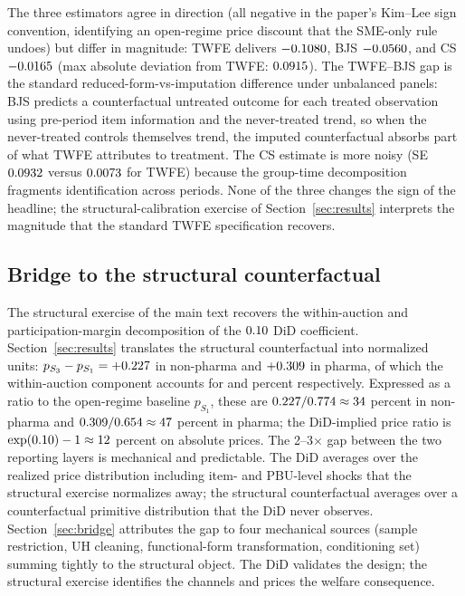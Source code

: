 The three estimators agree in direction (all negative in the paper's Kim--Lee sign convention, identifying an open-regime price discount that the SME-only rule undoes) but differ in magnitude: TWFE delivers $-0.1080$, BJS $-0.0560$, and CS $-0.0165$ (max absolute deviation from TWFE: $0.0915$). The TWFE--BJS gap is the standard reduced-form-vs-imputation difference under unbalanced panels: BJS predicts a counterfactual untreated outcome for each treated observation using pre-period item information and the never-treated trend, so when the never-treated controls themselves trend, the imputed counterfactual absorbs part of what TWFE attributes to treatment. The CS estimate is more noisy (SE $0.0932$ versus $0.0073$ for TWFE) because the group-time decomposition fragments identification across periods. None of the three changes the sign of the headline; the structural-calibration exercise of Section~\ref{sec:results} interprets the magnitude that the standard TWFE specification recovers.

\subsection{Bridge to the structural counterfactual}

The structural exercise of the main text recovers the within-auction and participation-margin decomposition of the $0.10$ DiD coefficient. Section~\ref{sec:results} translates the structural counterfactual into normalized units: $p_{S_3} - p_{S_1} = +0.227$ in non-pharma and $+0.309$ in pharma, of which the within-auction component accounts for \bneShareIntensNp{} and \bneShareIntensPh{} percent respectively. Expressed as a ratio to the open-regime baseline $p_{S_1}$, these are $0.227/0.774 \approx 34$ percent in non-pharma and $0.309/0.654 \approx 47$ percent in pharma; the DiD-implied price ratio is $\exp(0.10) - 1 \approx 12$ percent on absolute prices. The 2--3$\times$ gap between the two reporting layers is mechanical and predictable. The DiD averages over the realized price distribution including item- and PBU-level shocks that the structural exercise normalizes away; the structural counterfactual averages over a counterfactual primitive distribution that the DiD never observes. Section~\ref{sec:bridge} attributes the gap to four mechanical sources (sample restriction, UH cleaning, functional-form transformation, conditioning set) summing tightly to the structural object. The DiD validates the design; the structural exercise identifies the channels and prices the welfare consequence.
